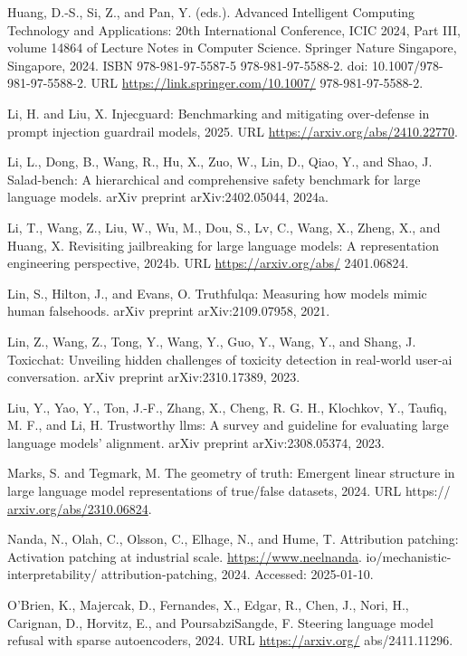 \documentclass[10pt]{article}
\begin{document}
Huang, D.-S., Si, Z., and Pan, Y. (eds.). Advanced Intelligent Computing Technology and Applications: 20th International Conference, ICIC 2024, Part III, volume 14864 of Lecture Notes in Computer Science. Springer Nature Singapore, Singapore, 2024. ISBN 978-981-97-5587-5 978-981-97-5588-2. doi: 10.1007/978-981-97-5588-2. URL \href{https://link.springer.com/10.1007/}{https://link.springer.com/10.1007/} 978-981-97-5588-2.

Li, H. and Liu, X. Injecguard: Benchmarking and mitigating over-defense in prompt injection guardrail models, 2025. URL \href{https://arxiv.org/abs/2410.22770}{https://arxiv.org/abs/2410.22770}.

Li, L., Dong, B., Wang, R., Hu, X., Zuo, W., Lin, D., Qiao, Y., and Shao, J. Salad-bench: A hierarchical and comprehensive safety benchmark for large language models. arXiv preprint arXiv:2402.05044, 2024a.

Li, T., Wang, Z., Liu, W., Wu, M., Dou, S., Lv, C., Wang, X., Zheng, X., and Huang, X. Revisiting jailbreaking for large language models: A representation engineering perspective, 2024b. URL \href{https://arxiv.org/abs/}{https://arxiv.org/abs/} 2401.06824.

Lin, S., Hilton, J., and Evans, O. Truthfulqa: Measuring how models mimic human falsehoods. arXiv preprint arXiv:2109.07958, 2021.

Lin, Z., Wang, Z., Tong, Y., Wang, Y., Guo, Y., Wang, Y., and Shang, J. Toxicchat: Unveiling hidden challenges of toxicity detection in real-world user-ai conversation. arXiv preprint arXiv:2310.17389, 2023.

Liu, Y., Yao, Y., Ton, J.-F., Zhang, X., Cheng, R. G. H., Klochkov, Y., Taufiq, M. F., and Li, H. Trustworthy llms: A survey and guideline for evaluating large language models’ alignment. arXiv preprint arXiv:2308.05374, 2023.

Marks, S. and Tegmark, M. The geometry of truth: Emergent linear structure in large language model representations of true/false datasets, 2024. URL https:// \href{http://arxiv.org/abs/2310.06824}{arxiv.org/abs/2310.06824}.

Nanda, N., Olah, C., Olsson, C., Elhage, N., and Hume, T. Attribution patching: Activation patching at industrial scale. \href{https://www.neelnanda}{https://www.neelnanda}. io/mechanistic-interpretability/ attribution-patching, 2024. Accessed: 2025-01-10.

O'Brien, K., Majercak, D., Fernandes, X., Edgar, R., Chen, J., Nori, H., Carignan, D., Horvitz, E., and PoursabziSangde, F. Steering language model refusal with sparse autoencoders, 2024. URL \href{https://arxiv.org/}{https://arxiv.org/} abs/2411.11296.
\end{document}
